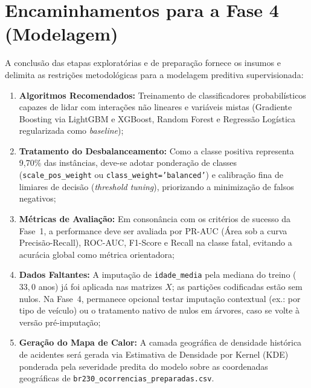 \documentclass[11pt,a4paper]{article}
\begin{document}
\section{Encaminhamentos para a Fase 4 (Modelagem)}

A conclusão das etapas exploratórias e de preparação fornece os insumos e delimita as restrições metodológicas para a modelagem preditiva supervisionada:

\begin{enumerate}
  \item \textbf{Algoritmos Recomendados:} Treinamento de classificadores probabilísticos capazes de lidar com interações não lineares e variáveis mistas (Gradiente Boosting via LightGBM e XGBoost, Random Forest e Regressão Logística regularizada como \textit{baseline});
  \item \textbf{Tratamento do Desbalanceamento:} Como a classe positiva representa 9,70\% das instâncias, deve-se adotar ponderação de classes (\texttt{scale\_pos\_weight} ou \texttt{class\_weight='balanced'}) e calibração fina de limiares de decisão (\textit{threshold tuning}), priorizando a minimização de falsos negativos;
  \item \textbf{Métricas de Avaliação:} Em consonância com os critérios de sucesso da Fase~1, a performance deve ser avaliada por PR-AUC (Área sob a curva Precisão-Recall), ROC-AUC, F1-Score e Recall na classe fatal, evitando a acurácia global como métrica orientadora;
  \item \textbf{Dados Faltantes:} A imputação de \texttt{idade\_media} pela mediana do treino ($33{,}0$ anos) já foi aplicada nas matrizes $X$; as partições codificadas estão sem nulos. Na Fase~4, permanece opcional testar imputação contextual (ex.: por tipo de veículo) ou o tratamento nativo de nulos em árvores, caso se volte à versão pré-imputação;
  \item \textbf{Geração do Mapa de Calor:} A camada geográfica de densidade histórica de acidentes será gerada via Estimativa de Densidade por Kernel (KDE) ponderada pela severidade predita do modelo sobre as coordenadas geográficas de \texttt{br230\_ocorrencias\_preparadas.csv}.
\end{enumerate}
\end{document}
